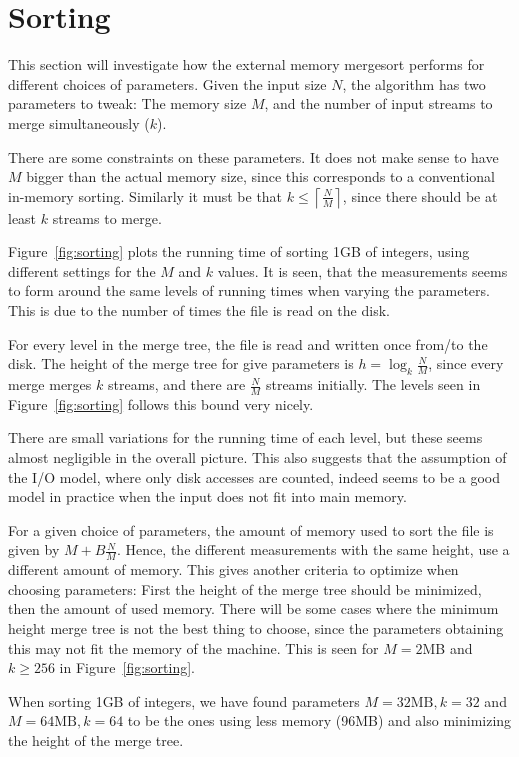 \documentclass[a4paper,12pt]{article}
\begin{document}
\section{Sorting}
This section will investigate how the external memory mergesort
performs for different choices of parameters. Given the input size
$N$, the algorithm has two parameters to tweak: The memory size $M$,
and the number of input streams to merge simultaneously ($k$).

There are some constraints on these parameters. It does not make sense
to have $M$ bigger than the actual memory size, since this corresponds
to a conventional in-memory sorting. Similarly it must be that $k \leq
\left\lceil\frac{N}{M}\right\rceil$, since there should be at least $k$ streams to merge.

Figure~\ref{fig:sorting} plots the running time of sorting 1GB of
integers, using different settings for the $M$ and $k$ values. It is
seen, that the measurements seems to form around the same levels of
running times when varying the parameters. This is due to the number
of times the file is read on the disk.

For every level in the merge tree, the file is read and written once
from/to the disk. The height of the merge tree for give parameters is
$h = \log_k \frac{N}{M}$, since every merge merges $k$ streams, and
there are $\frac{N}{M}$ streams initially. The levels seen in
Figure~\ref{fig:sorting} follows this bound very nicely.

There are small variations for the running time of each level, but
these seems almost negligible in the overall picture. This also
suggests that the assumption of the I/O model, where only disk
accesses are counted, indeed seems to be a good model in
practice when the input does not fit into main memory.

For a given choice of parameters, the amount of memory used to sort
the file is given by $M + B\frac{N}{M}$. Hence, the different
measurements with the same height, use a different amount of
memory. This gives another criteria to optimize when choosing
parameters: First the height of the merge tree should be minimized,
then the amount of used memory. There will be some cases where the
minimum height merge tree is not the best thing to choose, since the
parameters obtaining this may not fit the memory of the machine. This
is seen for $M = 2$MB and $k \geq 256$ in Figure~\ref{fig:sorting}.

When sorting 1GB of integers, we have found parameters $M = 32\textrm{MB}, k =
32$ and $M = 64\textrm{MB}, k = 64$ to be the ones using less memory (96MB) and also minimizing the height of the merge tree.
\end{document}

